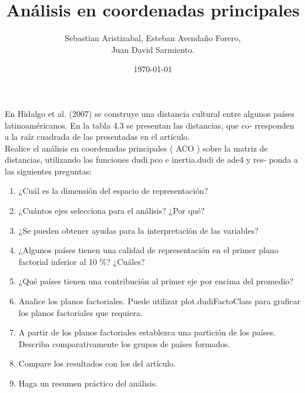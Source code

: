 \documentclass[letterpaper, 12pt]{article}
\title{Análisis en coordenadas principales}
\author{Sebastian Aristizabal, Esteban Avendaño Forero,\\
Juan David Sarmiento.}
\date{\today}
\begin{document}


\maketitle

En Hidalgo et al. (2007) se construye una distancia cultural entre algunos
países latinoaméricanos. En la tabla 4.3 se presentan las distancias, que co-
rresponden a la raíz cuadrada de las presentadas en el artículo.\\

\newpage
Realice el análisis en coordenadas principales ( ACO ) sobre la matriz de
distancias, utilizando las funciones dudi.pco e inertia.dudi de ade4 y res-
ponda a las siguientes preguntas:

\begin{enumerate}

        \item ¿Cuál es la dimensión del espacio de representación?
        
        \item ¿Cuántos ejes selecciona para el análisis? ¿Por qué?
        
        \item ¿Se pueden obtener ayudas para la interpretación de las variables?
        
        \item ¿Algunos países tienen una calidad de representación en el primer
        plano factorial inferior al 10 \%? ¿Cuáles?
        
        \item ¿Qué países tienen una contribución al primer eje por encima del
        promedio?
        
        \item Analice los planos factoriales. Puede utilizar plot.dudi{FactoClass}
        para graficar los planos factoriales que requiera.
        
        \item A partir de los planos factoriales establezca una partición de 
        los países. Describa comparativamente los grupos de países formados.
        
        \item Compare los resultados con los del artículo.
        
        \item Haga un resumen práctico del análisis.
        

\end{enumerate}
\end{document}
